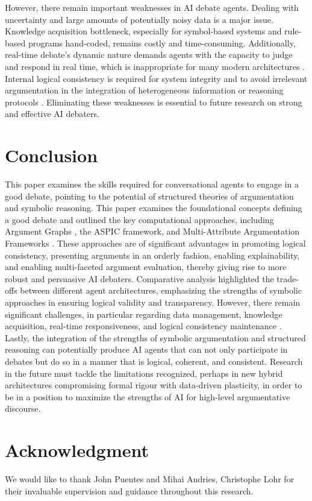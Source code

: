\documentclass[conference]{IEEEtran}
\begin{document}
However, there remain important weaknesses in AI debate agents. Dealing with uncertainty and large amounts of potentially noisy data is a major issue. Knowledge acquisition bottleneck, especially for symbol-based systems and rule-based programs hand-coded, remains costly and time-consuming. Additionally, real-time debate's dynamic nature demands agents with the capacity to judge and respond in real time, which is inappropriate for many modern architectures \cite{kasif2024trilogy}. Internal logical consistency is required for system integrity and to avoid irrelevant argumentation in the integration of heterogeneous information or reasoning protocols \cite{ilkou2020symbolic}. Eliminating these weaknesses is essential to future research on strong and effective AI debaters.

\section{Conclusion}
This paper examines the skills required for conversational agents to engage in a good debate, pointing to the potential of structured theories of argumentation and symbolic reasoning. This paper examines the foundational concepts defining a good debate \cite{rakshit2019debbie} \cite{tan2016winning}  and outlined the key computational approaches, including Argument Graphs \cite{chalaguine2020persuasive}, the ASPIC framework, and Multi-Attribute Argumentation Frameworks \cite{engelmann2022argumentation}. These approaches are of significant advantages in promoting logical consistency, presenting arguments in an orderly fashion, enabling explainability, and enabling multi-faceted argument evaluation, thereby giving rise to more robust and persuasive AI debaters.
Comparative analysis highlighted the trade-offs between different agent architectures, emphasizing the strengths of symbolic approaches in ensuring logical validity and transparency. However, there remain significant challenges, in particular regarding data management, knowledge acquisition, real-time responsiveness, and logical consistency maintenance \cite{ilkou2020symbolic}.\cite{kasif2024trilogy}
Lastly, the integration of the strengths of symbolic argumentation and structured reasoning can potentially produce AI agents that can not only participate in debates but do so in a manner that is logical, coherent, and consistent. Research in the future must tackle the limitations recognized, perhaps in new hybrid architectures compromising formal rigour with data-driven plasticity, in order to be in a position to maximize the strengths of AI for high-level argumentative discourse.


\section*{Acknowledgment}
We would like to thank John Puentes and Mihai Andries, Christophe Lohr for their invaluable supervision and guidance throughout this research.

\printbibliography[notkeyword=web, title={References}]

    
\end{document}
